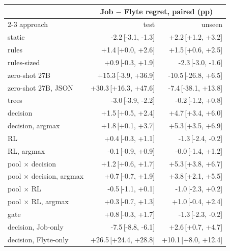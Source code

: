 \begin{tabular}{@{}lrr@{}}
\toprule
& \multicolumn{2}{c}{Job $-$ Flyte regret, paired (pp)} \\
\cmidrule(l){2-3}
approach & test & unseen \\
\midrule
static & -2.2\,{\scriptsize[-3.1, -1.3]} & +2.2\,{\scriptsize[+1.2, +3.2]} \\
rules & +1.4\,{\scriptsize[+0.0, +2.6]} & +1.5\,{\scriptsize[+0.6, +2.5]} \\
rules-sized & +0.9\,{\scriptsize[-0.3, +1.9]} & -2.3\,{\scriptsize[-3.0, -1.6]} \\
zero-shot 27B & +15.3\,{\scriptsize[-3.9, +36.9]} & -10.5\,{\scriptsize[-26.8, +6.5]} \\
zero-shot 27B, JSON & +30.3\,{\scriptsize[+16.3, +47.6]} & -7.4\,{\scriptsize[-38.1, +13.8]} \\
trees & -3.0\,{\scriptsize[-3.9, -2.2]} & -0.2\,{\scriptsize[-1.2, +0.8]} \\
decision & +1.5\,{\scriptsize[+0.5, +2.4]} & +4.7\,{\scriptsize[+3.4, +6.0]} \\
decision, argmax & +1.8\,{\scriptsize[+0.1, +3.7]} & +5.3\,{\scriptsize[+3.5, +6.9]} \\
RL & +0.4\,{\scriptsize[-0.3, +1.1]} & -1.3\,{\scriptsize[-2.4, -0.2]} \\
RL, argmax & -0.1\,{\scriptsize[-0.9, +0.9]} & -0.0\,{\scriptsize[-1.4, +1.2]} \\
pool $\times$ decision & +1.2\,{\scriptsize[+0.6, +1.7]} & +5.3\,{\scriptsize[+3.8, +6.7]} \\
pool $\times$ decision, argmax & +0.7\,{\scriptsize[-0.7, +1.9]} & +3.8\,{\scriptsize[+2.1, +5.5]} \\
pool $\times$ RL & -0.5\,{\scriptsize[-1.1, +0.1]} & -1.0\,{\scriptsize[-2.3, +0.2]} \\
pool $\times$ RL, argmax & +0.3\,{\scriptsize[-0.7, +1.3]} & +1.0\,{\scriptsize[-0.4, +2.4]} \\
gate & +0.8\,{\scriptsize[-0.3, +1.7]} & -1.3\,{\scriptsize[-2.3, -0.2]} \\
decision, Job-only & -7.5\,{\scriptsize[-8.8, -6.1]} & +2.6\,{\scriptsize[+0.7, +4.7]} \\
decision, Flyte-only & +26.5\,{\scriptsize[+24.4, +28.8]} & +10.1\,{\scriptsize[+8.0, +12.4]} \\
\bottomrule
\end{tabular}
